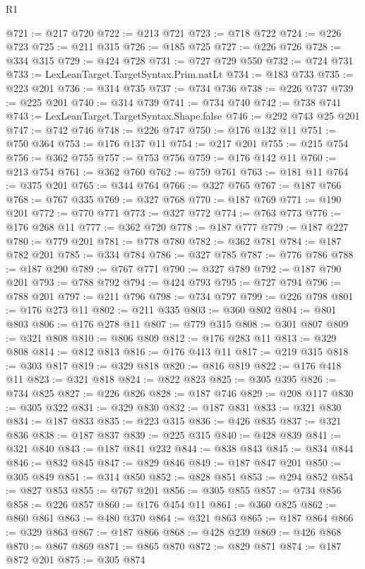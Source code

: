 \begin{lexlean}{R1}
\begin{coremodule}
@721 := @217 @720
@722 := @213 @721
@723 := @718 @722
@724 := @226 @723
@725 := @211 @315
@726 := @185 @725
@727 := @226 @726
@728 := @334 @315
@729 := @424 @728
@731 := @727 @729 @550
@732 := @724 @731
@733 := LexLeanTarget.TargetSyntax.Prim.natLt
@734 := @183 @733
@735 := @223 @201
@736 := @314 @735
@737 := @734 @736
@738 := @226 @737
@739 := @225 @201
@740 := @314 @739
@741 := @734 @740
@742 := @738 @741
@743 := LexLeanTarget.TargetSyntax.Shape.false
@746 := @292 @743 @25 @201
@747 := @742 @746
@748 := @226 @747
@750 := @176 @132 @11
@751 := @750 @364
@753 := @176 @137 @11
@754 := @217 @201
@755 := @215 @754
@756 := @362 @755
@757 := @753 @756
@759 := @176 @142 @11
@760 := @213 @754
@761 := @362 @760
@762 := @759 @761
@763 := @181 @11
@764 := @375 @201
@765 := @344 @764
@766 := @327 @765
@767 := @187 @766
@768 := @767 @335
@769 := @327 @768
@770 := @187 @769
@771 := @190 @201
@772 := @770 @771
@773 := @327 @772
@774 := @763 @773
@776 := @176 @268 @11
@777 := @362 @720
@778 := @187 @777
@779 := @187 @227
@780 := @779 @201
@781 := @778 @780
@782 := @362 @781
@784 := @187 @782 @201
@785 := @334 @784
@786 := @327 @785
@787 := @776 @786
@788 := @187 @290
@789 := @767 @771
@790 := @327 @789
@792 := @187 @790 @201
@793 := @788 @792
@794 := @424 @793
@795 := @727 @794
@796 := @788 @201
@797 := @211 @796
@798 := @734 @797
@799 := @226 @798
@801 := @176 @273 @11
@802 := @211 @335
@803 := @360 @802
@804 := @801 @803
@806 := @176 @278 @11
@807 := @779 @315
@808 := @301 @807
@809 := @321 @808
@810 := @806 @809
@812 := @176 @283 @11
@813 := @329 @808
@814 := @812 @813
@816 := @176 @413 @11
@817 := @219 @315
@818 := @303 @817
@819 := @329 @818
@820 := @816 @819
@822 := @176 @418 @11
@823 := @321 @818
@824 := @822 @823
@825 := @305 @395
@826 := @734 @825
@827 := @226 @826
@828 := @187 @746
@829 := @208 @117
@830 := @305 @322
@831 := @329 @830
@832 := @187 @831
@833 := @321 @830
@834 := @187 @833
@835 := @223 @315
@836 := @426 @835
@837 := @321 @836
@838 := @187 @837
@839 := @225 @315
@840 := @428 @839
@841 := @321 @840
@843 := @187 @841 @232
@844 := @838 @843
@845 := @834 @844
@846 := @832 @845
@847 := @829 @846
@849 := @187 @847 @201
@850 := @305 @849
@851 := @314 @850
@852 := @828 @851
@853 := @294 @852
@854 := @827 @853
@855 := @767 @201
@856 := @305 @855
@857 := @734 @856
@858 := @226 @857
@860 := @176 @454 @11
@861 := @360 @825
@862 := @860 @861
@863 := @480 @370
@864 := @321 @863
@865 := @187 @864
@866 := @329 @863
@867 := @187 @866
@868 := @428 @239
@869 := @426 @868
@870 := @867 @869
@871 := @865 @870
@872 := @829 @871
@874 := @187 @872 @201
@875 := @305 @874

\end{coremodule}
\end{lexlean}
